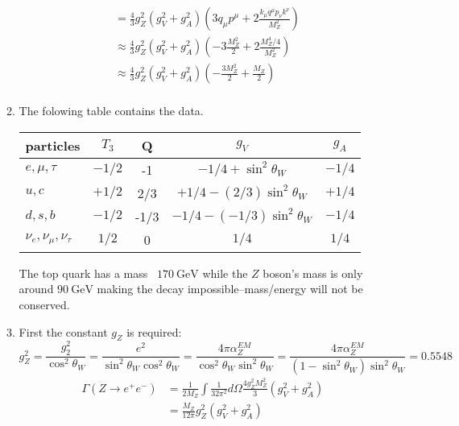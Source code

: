 \documentclass[12pt,a4]{article}
\begin{document}
\begin{enumerate}
\begin{enumerate}
\begin{align*}
                                &= \frac{4}{3} g_Z^2  (g_V^2 + g_A^2)\left( 3 q_\mu p^\mu + 2 \frac{k_\mu q^\mu p_\nu k^\nu}{M_Z^2} \right)\\
                                &\approx \frac{4}{3} g_Z^2  (g_V^2 + g_A^2)\left( - 3 \frac{M_Z^2}{2}  + 2 \frac{ M_Z^4 / 4}{M_Z^2} \right)\\
                                &\approx \frac{4}{3} g_Z^2  (g_V^2 + g_A^2)\left( -  \frac{3 M_Z^2}{2}  +  \frac{ M_Z }{2} \right)\\
        \end{align*}
      \item
        The folowing table contains the data.
        \begin{table}[!h]
          \centering
          \begin{tabular}{l c c c c}
            \toprule
            particles         & $T_3$ & Q & $g_V$ & $g_A$ \\
            \midrule
            $e, \mu, \tau$    & $-1/2$   & -1 & $-1/4 + \sin^2\theta_W$ & $-1/4$ \\
            $u, c        $    & $+1/2$  & 2/3 & $+1/4 - (2 / 3) \sin^2\theta_W$ & $+1/4$ \\
            $d, s , b    $    & $-1/2$  & -1/3 & $-1/4 - (-1/3) \sin^2 \theta_W$ & $-1/4$ \\
            $\nu_e, \nu_\mu, \nu_\tau $ & $1/2$ & 0 & $1 / 4$ & $1 / 4$ \\
            \bottomrule
          \end{tabular}
        \end{table}
        The top quark has a mass ~$\SI{170}{\giga \eV}$ while the $Z$ boson's mass is only around $\SI{90}{\giga \eV}$ making the decay impossible--mass/energy will not be conserved.
      \item
        First the constant $g_Z$ is required:
        \begin{equation*}
          g_Z^2 = \frac{g_2^2}{\cos^2 \theta_W} = \frac{e^2}{\sin^2 \theta_W \cos^2 \theta_W} = \frac{4 \pi \alpha_Z^{EM}}{\cos^2 \theta_W \sin^2 \theta_W} = \frac{4 \pi \alpha_Z^{EM}}{(1 - \sin^2 \theta_W) \sin^2 \theta_W} = 0.5548
        \end{equation*}
        \begin{align*}
          \Gamma(Z \to e^+ e^-) 
                                &= \frac{1}{2 M_Z}\int \frac{1}{32 \pi^2} d\Omega \frac{4 g_Z^2 M_Z^2}{3} (g_V^2 + g_A^2) \\
                                &= \frac{M_Z}{12 \pi } g_Z^2 (g_V^2 + g_A^2) \\

\end{align*}
\end{enumerate}
\end{enumerate}
\end{document}
